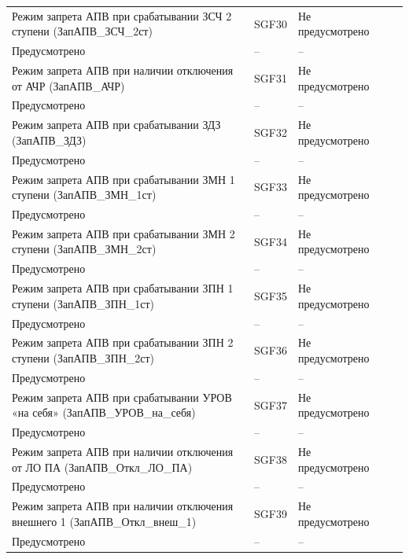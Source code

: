 \begin{longtable}{|>{\centering\arraybackslash}m{5.3cm}|>{\centering\arraybackslash}m{3.3cm}|>{\centering\arraybackslash}m{4.2cm}|>{\centering\arraybackslash}m{1.8cm}|>{\centering\arraybackslash}m{1cm}|}
\hline
\centering Режим запрета АПВ при срабатывании ЗСЧ 2 ступени (ЗапАПВ\_ЗСЧ\_2ст)  & \centering SGF30 & \centering Не предусмотрено \\ Предусмотрено & \centering -- & \centering \arraybackslash -- \\
\hline
\centering Режим запрета АПВ при наличии отключения от АЧР (ЗапАПВ\_АЧР)  & \centering SGF31 & \centering Не предусмотрено \\ Предусмотрено & \centering -- & \centering \arraybackslash -- \\
\hline
\centering Режим запрета АПВ при срабатывании ЗДЗ (ЗапАПВ\_ЗДЗ)  & \centering SGF32 & \centering Не предусмотрено \\ Предусмотрено & \centering -- & \centering \arraybackslash -- \\
\hline
\centering Режим запрета АПВ при срабатывании ЗМН 1 ступени (ЗапАПВ\_ЗМН\_1ст)  & \centering SGF33 & \centering Не предусмотрено \\ Предусмотрено & \centering -- & \centering \arraybackslash -- \\
\hline
\centering Режим запрета АПВ при срабатывании ЗМН 2 ступени (ЗапАПВ\_ЗМН\_2ст)  & \centering SGF34 & \centering Не предусмотрено \\ Предусмотрено & \centering -- & \centering \arraybackslash -- \\
\hline
\centering Режим запрета АПВ при срабатывании ЗПН 1 ступени (ЗапАПВ\_ЗПН\_1ст)  & \centering SGF35 & \centering Не предусмотрено \\ Предусмотрено & \centering -- & \centering \arraybackslash -- \\
\hline
\centering Режим запрета АПВ при срабатывании ЗПН 2 ступени (ЗапАПВ\_ЗПН\_2ст)  & \centering SGF36 & \centering Не предусмотрено \\ Предусмотрено & \centering -- & \centering \arraybackslash -- \\
\hline
\centering Режим запрета АПВ при срабатывании УРОВ «на себя» (ЗапАПВ\_УРОВ\_на\_себя)  & \centering SGF37 & \centering Не предусмотрено \\ Предусмотрено & \centering -- & \centering \arraybackslash -- \\
\hline
\centering Режим запрета АПВ при наличии отключения от ЛО ПА (ЗапАПВ\_Откл\_ЛО\_ПА)  & \centering SGF38 & \centering Не предусмотрено \\ Предусмотрено & \centering -- & \centering \arraybackslash -- \\
\hline
\centering Режим запрета АПВ при наличии отключения внешнего 1 (ЗапАПВ\_Откл\_внеш\_1)  & \centering SGF39 & \centering Не предусмотрено \\ Предусмотрено & \centering -- & \centering \arraybackslash -- \\

\end{longtable}
